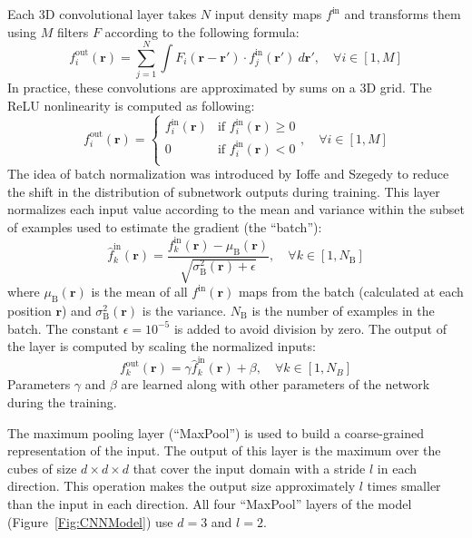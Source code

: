 \documentclass{bioinfo}
\begin{document}
Each 3D convolutional layer takes $N$ input density maps $f^\text{in}$
and transforms them using $M$ filters $F$ according to the following
formula:
\begin{equation}
f^\text{out}_i (\mathbf{r}) = \sum^{N}_{j=1} \int F_i (\mathbf{r} - \mathbf{r'}) \cdot f^\text{in}_j(\mathbf{r'}) ~d\mathbf{r'}, \quad\forall i \in [1,M]
\end{equation}
In practice, these convolutions are approximated by sums on a 3D grid.
The ReLU nonlinearity is computed as following:
\begin{equation}
f^\text{out}_i (\mathbf{r}) = \begin{cases}
               f^\text{in}_i(\mathbf{r}) &\text{if } f^\text{in}_i(\mathbf{r})\geq 0\\
               0                         &\text{if } f^\text{in}_i(\mathbf{r})<0\\
            \end{cases}, \quad\forall i \in [1,M]
\end{equation}
The idea of batch normalization was introduced by Ioffe and Szegedy
\citep{ioffe2015batch} to reduce the shift in the distribution of
subnetwork outputs during training. This layer normalizes each input
value according to the mean and variance within the subset of examples
used to estimate the gradient (the ``batch''):
\begin{equation}
\hat{f}^\text{in}_k(\mathbf{r}) = \frac{f^\text{in}_k(\mathbf{r}) - \mu_\text{B}(\mathbf{r})}{\sqrt{\sigma^{2}_\text{B}(\mathbf{r}) + \epsilon}}, \quad\forall k \in [1,N_\text{B}]
\end{equation}
where $\mu_\text{B}(\mathbf{r})$ is the mean of all
$f^\text{in}(\mathbf{r})$ maps from the batch (calculated at each
position $\mathbf{r}$) and $\sigma^{2}_\text{B}(\mathbf{r})$ is the
variance. $N_\text{B}$ is the number of examples in the batch. The constant
$\epsilon = 10^{-5}$ is added to avoid division by zero.
The output of the layer is computed by scaling the normalized inputs:
\begin{equation}
f^\text{out}_k(\mathbf{r}) = \gamma \hat{f}^\text{in}_k(\mathbf{r}) + \beta, \quad\forall k \in [1,N_B]
\end{equation}
Parameters $\gamma$ and $\beta$ are learned along with other
parameters of the network during the training.

The maximum pooling layer (``MaxPool'') is used to build a
coarse-grained representation of the input. The output of this layer
is the maximum over the cubes of size $d \times d \times d$ that cover
the input domain with a stride $l$ in each direction.  This operation
makes the output size approximately $l$ times smaller than the
input in each direction.  All four ``MaxPool'' layers of the model
(Figure~\ref{Fig:CNNModel}) use $d=3$ and $l=2$.
\end{document}
